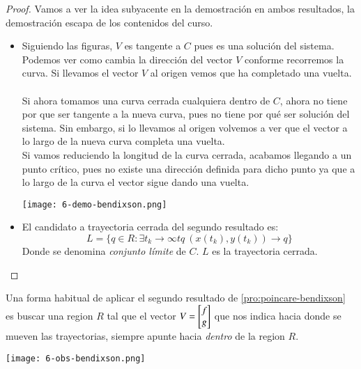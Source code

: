 \begin{proof}
    Vamos a ver la idea subyacente en la demostración en ambos resultados, la demostración escapa de los contenidos del curso.
    \begin{itemize}
        \item Siguiendo las figuras, $V$ es tangente a $C$ pues es una solución del sistema. Podemos ver como cambia la dirección del vector $V$ conforme recorremos la curva. Si llevamos el vector $V$ al origen vemos que ha completado una vuelta.\\\\
        Si ahora tomamos una curva cerrada cualquiera dentro de $C$, ahora no tiene por que ser tangente a la nueva curva, pues no tiene por qué ser solución del sistema. Sin embargo, si lo llevamos al origen volvemos a ver que el vector a lo largo de la nueva curva completa una vuelta.\\
        Si vamos reduciendo la longitud de la curva cerrada, acabamos llegando a un punto crítico, pues no existe una dirección definida para dicho punto ya que a lo largo de la curva el vector sigue dando una vuelta.
        \begin{center}
            \texttt{[image: 6-demo-bendixson.png]}
        \end{center}
        \item El candidato a trayectoria cerrada del segundo resultado es:
        $$
            L = \{ q \in R : \exists t_k \to \infty tq\ (x(t_k), y(t_k)) \to q \}
        $$
        Donde se denomina \textit{conjunto límite} de $C$. $L$ es la trayectoria cerrada.
    \end{itemize}
\end{proof}
\begin{obs}
    Una forma habitual de aplicar el segundo resultado de \ref{pro:poincare-bendixson} es buscar una region $R$ tal que el vector $V = \mx{f \\ g}$ que nos indica hacia donde se mueven las trayectorias, siempre apunte hacia \textit{dentro} de la region $R$.
    \begin{center}
        \texttt{[image: 6-obs-bendixson.png]}
    \end{center}
\end{obs}
